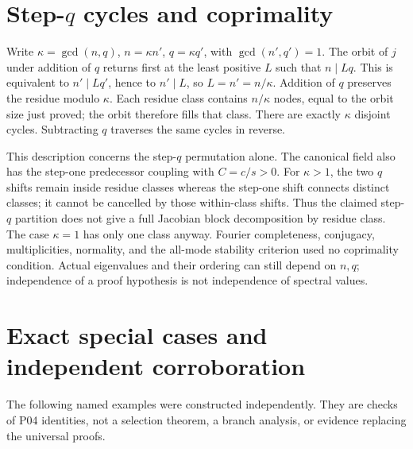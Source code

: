 \documentclass[11pt]{article}
\begin{document}
\section{Step-\texorpdfstring{$q$}{q} cycles and coprimality}
Write $\kappa=\gcd(n,q)$, $n=\kappa n'$, $q=\kappa q'$, with
$\gcd(n',q')=1$. The orbit of $j$ under addition of $q$ returns first at
the least positive $L$ such that $n\mid Lq$. This is equivalent to
$n'\mid Lq'$, hence to $n'\mid L$, so $L=n'=n/\kappa$.
Addition of $q$ preserves the residue modulo $\kappa$. Each residue class
contains $n/\kappa$ nodes, equal to the orbit size just proved; the orbit
therefore fills that class. There are exactly $\kappa$ disjoint cycles.
Subtracting $q$ traverses the same cycles in reverse.

This description concerns the step-$q$ permutation alone. The canonical
field also has the step-one predecessor coupling with $C=c/s>0$.
For $\kappa>1$, the two $q$ shifts remain inside residue classes whereas
the step-one shift connects distinct classes; it cannot be cancelled by
those within-class shifts. Thus the claimed step-$q$ partition does not
give a full Jacobian block decomposition by residue class. The case
$\kappa=1$ has only one class anyway. Fourier completeness, conjugacy,
multiplicities, normality, and the all-mode stability criterion used no
coprimality condition. Actual eigenvalues and their ordering can still
depend on $n,q$; independence of a proof hypothesis is not independence
of spectral values.

\section{Exact special cases and independent corroboration}
The following named examples were constructed independently. They are
checks of P04 identities, not a selection theorem, a branch analysis, or
evidence replacing the universal proofs.
\end{document}
